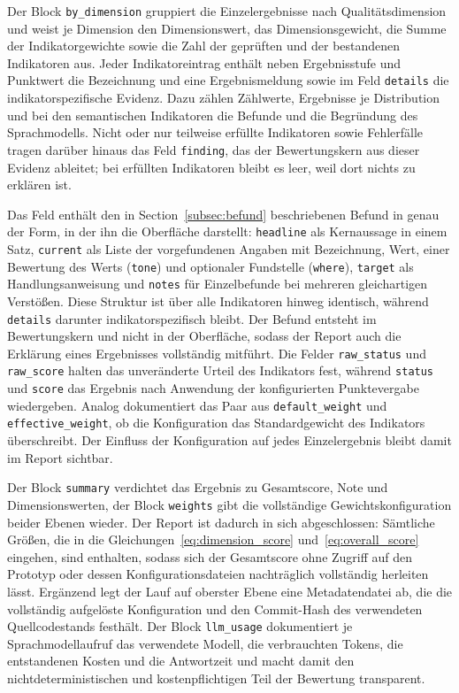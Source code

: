 Der Block \texttt{by\_dimension} gruppiert die Einzelergebnisse nach Qualitätsdimension und weist je Dimension den Dimensionswert, das Dimensionsgewicht, die Summe der Indikatorgewichte sowie die Zahl der geprüften und der bestandenen Indikatoren aus. Jeder Indikatoreintrag enthält neben Ergebnisstufe und Punktwert die Bezeichnung und eine Ergebnismeldung sowie im Feld \texttt{details} die indikatorspezifische Evidenz. Dazu zählen Zählwerte, Ergebnisse je Distribution und bei den semantischen Indikatoren die Befunde und die Begründung des Sprachmodells. Nicht oder nur teilweise erfüllte Indikatoren sowie Fehlerfälle tragen darüber hinaus das Feld \texttt{finding}, das der Bewertungskern aus dieser Evidenz ableitet; bei erfüllten Indikatoren bleibt es leer, weil dort nichts zu erklären ist.

Das Feld enthält den in Section~\ref{subsec:befund} beschriebenen Befund in genau der Form, in der ihn die Oberfläche darstellt: \texttt{headline} als Kernaussage in einem Satz, \texttt{current} als Liste der vorgefundenen Angaben mit Bezeichnung, Wert, einer Bewertung des Werts (\texttt{tone}) und optionaler Fundstelle (\texttt{where}), \texttt{target} als Handlungsanweisung und \texttt{notes} für Einzelbefunde bei mehreren gleichartigen Verstößen. Diese Struktur ist über alle Indikatoren hinweg identisch, während \texttt{details} darunter indikatorspezifisch bleibt. Der Befund entsteht im Bewertungskern und nicht in der Oberfläche, sodass der Report auch die Erklärung eines Ergebnisses vollständig mitführt. Die Felder \texttt{raw\_status} und \texttt{raw\_score} halten das unveränderte Urteil des Indikators fest, während \texttt{status} und \texttt{score} das Ergebnis nach Anwendung der konfigurierten Punktevergabe wiedergeben. Analog dokumentiert das Paar aus \texttt{default\_weight} und \texttt{effective\_weight}, ob die Konfiguration das Standardgewicht des Indikators überschreibt. Der Einfluss der Konfiguration auf jedes Einzelergebnis bleibt damit im Report sichtbar.

Der Block \texttt{summary} verdichtet das Ergebnis zu Gesamtscore, Note und Dimensionswerten, der Block \texttt{weights} gibt die vollständige Gewichtskonfiguration beider Ebenen wieder. Der Report ist dadurch in sich abgeschlossen: Sämtliche Größen, die in die Gleichungen~\ref{eq:dimension_score} und~\ref{eq:overall_score} eingehen, sind enthalten, sodass sich der Gesamtscore ohne Zugriff auf den Prototyp oder dessen Konfigurationsdateien nachträglich vollständig herleiten lässt. Ergänzend legt der Lauf auf oberster Ebene eine Metadatendatei ab, die die vollständig aufgelöste Konfiguration und den Commit-Hash des verwendeten Quellcodestands festhält. Der Block \texttt{llm\_usage} dokumentiert je Sprachmodellaufruf das verwendete Modell, die verbrauchten Tokens, die entstandenen Kosten und die Antwortzeit und macht damit den nichtdeterministischen und kostenpflichtigen Teil der Bewertung transparent.

